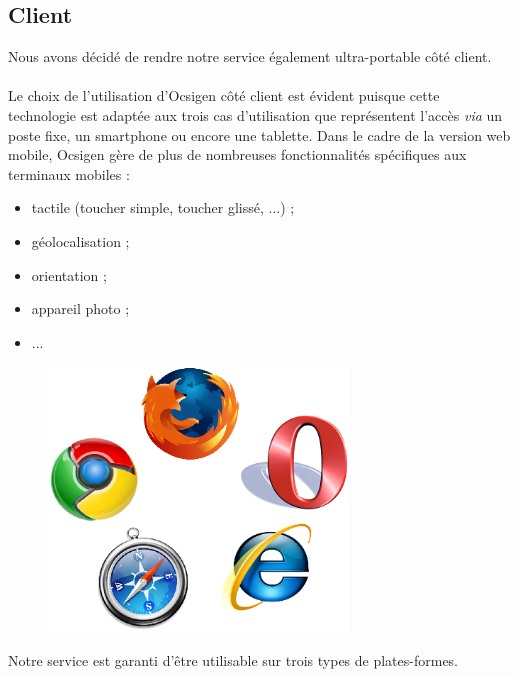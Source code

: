 \documentclass{life-fr}
\begin{document}
\subsection{Client}

Nous avons décidé de rendre notre service également ultra-portable côté client.\\
\\
Le choix de l'utilisation d'Ocsigen côté client est évident puisque cette 
technologie est adaptée aux trois cas d'utilisation que représentent l'accès
\textit{via} un poste fixe, un smartphone ou encore une tablette. Dans le cadre
de la version web mobile, Ocsigen gère de plus de nombreuses fonctionnalités 
spécifiques aux terminaux mobiles :
\begin{itemize}
  \item tactile (toucher simple, toucher glissé, ...) ;
  \item géolocalisation ;
  \item orientation ;
  \item appareil photo ;
  \item ...
\end{itemize}

\begin{figure}[H]
  \begin{center}
    \includegraphics[width=8cm]{img/navigateurs.png}
  \end{center}
\end{figure}

Notre service est garanti d'être utilisable sur trois types de plates-formes.
\end{document}
